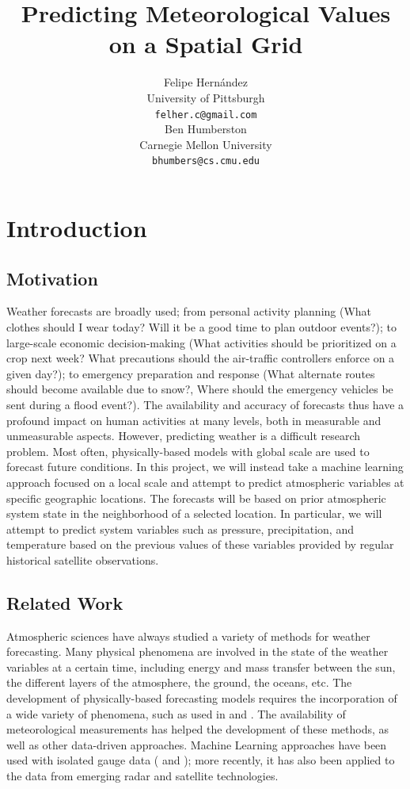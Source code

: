 \documentclass{article} %
\title{Predicting Meteorological Values on a Spatial Grid}
\author{
Felipe Hern\'{a}ndez \\
University of Pittsburgh \\
\texttt{felher.c@gmail.com} \\
\And
Ben Humberston\\
Carnegie Mellon University \\
\texttt{bhumbers@cs.cmu.edu} \\
}
\begin{document}
\maketitle


\section{Introduction}
\label{sec:intro}

\subsection{Motivation}
\label{sec:motivation}
Weather forecasts are broadly used; from personal activity planning (What clothes should I wear today? Will it be a good time to plan outdoor events?); to large-scale economic decision-making (What activities should be prioritized on a crop next week? What precautions should the air-traffic controllers enforce on a given day?); to emergency preparation and response (What alternate routes should become available due to snow?, Where should the emergency vehicles be sent during a flood event?). The availability and accuracy of forecasts thus have a profound impact on human activities at many levels, both in measurable and unmeasurable aspects. However, predicting weather is a difficult research problem. Most often, physically-based models with global scale are used to forecast future conditions. In this project, we will instead take a machine learning approach focused on a local scale and attempt to predict atmospheric variables at specific geographic locations. The forecasts will be based on prior atmospheric system state in the neighborhood of a selected location. In particular, we will attempt to predict system variables such as pressure, precipitation, and temperature based on the previous values of these variables provided by regular historical satellite observations.

\subsection{Related Work}\label{sec:related_work}
Atmospheric sciences have always studied a variety of methods for weather forecasting. Many physical phenomena are involved in the state of the weather variables at a certain time, including energy and mass transfer between the sun, the different layers of the atmosphere, the ground, the oceans, etc. The development of physically-based forecasting models requires the incorporation of a wide variety of phenomena, such as used in \cite{Shuttleworth2012} and \cite{Harris2001}. The availability of meteorological measurements has helped the development of these methods, as well as other data-driven approaches. Machine Learning approaches have been used with isolated gauge data (\cite{Hong2008} and \cite{Paras2012}); more recently, it has also been applied to the data from emerging radar \cite{Ferraro1995} and satellite \cite{Yang2007} technologies.
\end{document}
